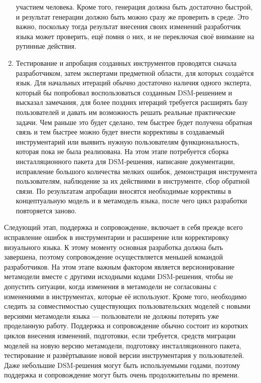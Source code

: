 \begin{enumerate}
		участием человека. Кроме того, генерация должна быть достаточно быстрой, и результат 
		генерации должно быть можно сразу же проверить в среде. Это важно, поскольку тогда 
		результат внесения своих изменений разработчик языка может проверить, ещё помня 
		о них, и не переключая своё внимание на рутинные действия. 
	\item Тестирование и апробация созданных инструментов проводятся сначала разработчиком, 
		затем экспертами предметной области, для которых создаётся язык. Для начальных 
		итераций обычно достаточно наличия одного эксперта, который бы попробовал воспользоваться 
		созданным \ac{DSM}-решением и высказал замечания, для более поздних итераций требуется 
		расширять базу пользователей и давать им возможность решать реальные практические задачи. 
		Чем раньше это будет сделано, тем быстрее будет получена обратная связь и тем 
		быстрее можно будет внести коррективы в создаваемый инструментарий или выявить 
		нужную пользователям функциональность, которая пока не была реализована. На этом 
		этапе потребуется сборка инсталляционного пакета для \ac{DSM}-решения, написание документации, 
		исправление большого количества мелких ошибок, демонстрация инструмента пользователям, 
		наблюдение за их действиями в инструменте, сбор обратной связи. По результатам 
		апробации вносятся необходимые коррективы в концептуальную модель и в метамодель 
		языка, после чего цикл разработки повторяется заново.
\end{enumerate}

Следующий этап, поддержка и сопровождение, включает в себя прежде всего исправление 
ошибок в инструментарии и расширение или корректировку визуального языка. К этому 
моменту основная разработка должна быть завершена, поэтому сопровождение осуществляется 
меньшей командой разработчиков. На этом этапе важным фактором является версионирование 
метамодели вместе с другими исходными кодами \ac{DSM}-решения, чтобы не допустить ситуации, 
когда изменения в метамодели не согласованы с изменениями в инструментах, которые её 
используют. Кроме того, необходимо следить за совместимостью существующих пользовательских 
моделей с новыми версиями метамодели языка --- пользователи не должны потерять уже 
проделанную работу. Поддержка и сопровождение обычно состоит из коротких циклов внесения 
изменений, подготовки, если требуется, средств миграции моделей на новую версию метамодели, 
подготовку инсталляционного пакета, тестирование и развёртывание новой версии инструментария 
у пользователей. Даже небольшие \ac{DSM}-решения могут быть используемыми годами, поэтому 
поддержка и сопровождение могут быть очень продолжительны по времени.

